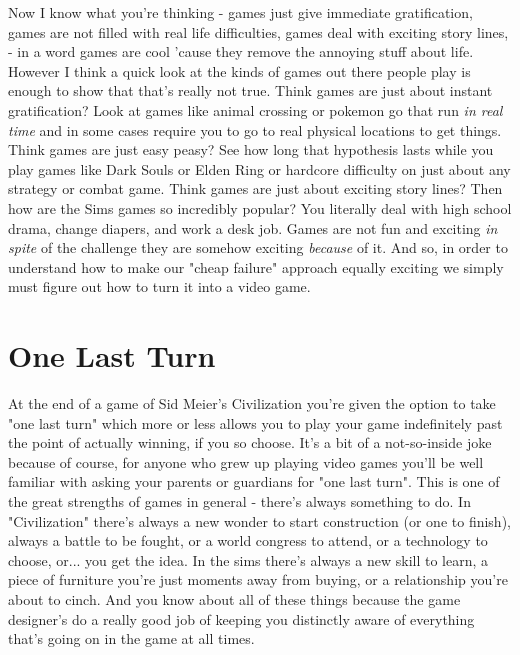 \documentclass[11pt,a5paper]{book}
\begin{document}
Now I know what you're thinking - games just give immediate gratification, games are not filled with real life difficulties, games deal with exciting story lines,   - in a word games are cool 'cause they remove the annoying stuff about life. However I think a quick look at the kinds of games out there people play is enough to show that that's really not true. Think games are just about instant gratification? Look at games like animal crossing or pokemon go that run \textit{in real time} and in some cases require you to go to real physical locations to get things. Think games are just easy peasy? See how long that hypothesis lasts while you play games like Dark Souls or Elden Ring or hardcore difficulty on just about any strategy or combat game. Think games are just about exciting story lines? Then how are the Sims games so incredibly popular? You literally deal with high school drama, change diapers, and work a desk job. Games are not fun and exciting \textit{in spite} of the challenge they are somehow exciting \textit{because} of it. And so, in order to understand how to make our "cheap failure" approach equally exciting we simply must figure out how to turn it into a video game. 

\section{One Last Turn}
At the end of a game of Sid Meier's Civilization you're given the option to take "one last turn" which more or less allows you to play your game indefinitely past the point of actually winning, if you so choose. It's a bit of a not-so-inside joke because of course, for anyone who grew up playing video games you'll be well familiar with asking your parents or guardians for "one last turn". This is one of the great strengths of games in general - there's always something to do. In "Civilization" there's always a new wonder to start construction (or one to finish), always a battle to be fought, or a world congress to attend, or a technology to choose, or... you get the idea. In the sims there's always a new skill to learn, a piece of furniture you're just moments away from buying, or a relationship you're about to cinch. And you know about all of these things because the game designer's do a really good job of keeping you distinctly aware of everything that's going on in the game at all times. 
\newline
\end{document}
